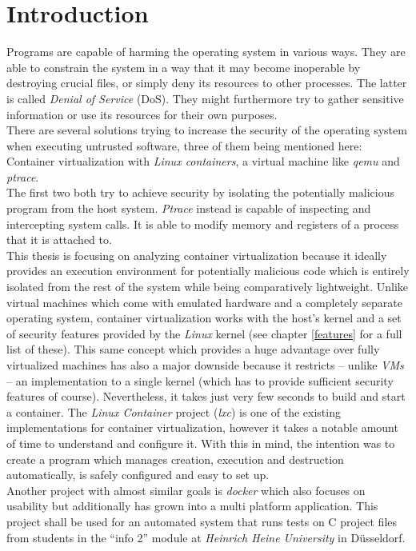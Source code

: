 \chapter{Introduction}

Programs are capable of harming the operating system in various ways. They are able to constrain the system in a way that
it may become inoperable by destroying crucial files, or simply deny its resources to other processes.
The latter is called \textit{Denial of Service} (DoS).
They might furthermore try to gather sensitive information or use its resources for their own purposes.\\
There are several solutions trying to increase the security of the operating system when executing untrusted software,
three of them being mentioned here:\\
Container virtualization with \textit{Linux containers}\cite{lxc}, a virtual machine like \textit{qemu}\cite{qemu} and \textit{ptrace}\cite{ptrace}.\\
The first two both try to achieve security by isolating the potentially malicious program from the host system.
\textit{Ptrace} instead is capable of inspecting and intercepting system calls. It is able to modify memory and registers of a process that it is attached to.\\
This thesis is focusing on analyzing container virtualization because it ideally provides an execution environment for
potentially malicious code which is entirely isolated from the rest of the system while being comparatively
lightweight. Unlike virtual machines which come with emulated hardware and a completely separate operating
system, container virtualization works with the host's kernel and a set of security features provided by the
\textit{Linux} kernel (see chapter \ref{features} for a full list of these).
This same concept which provides a huge advantage over fully virtualized machines has also a major downside
because it restricts -- unlike  \textit{VMs} -- an implementation to a single kernel (which has to provide sufficient
security features of course). Nevertheless, it takes just very few seconds to build and start a container.
The \textit{Linux Container} project (\textit{lxc}) is one of the existing implementations for container virtualization,
however it takes a notable amount of time to understand and configure it. With this in mind, the intention was to create a program
which manages creation, execution and destruction automatically, is safely configured and easy to set up.\\
Another project with almost similar goals is \textit{docker}\cite{docker} which also focuses on usability but
additionally has grown into a multi platform application.
This project shall be used for an automated system that runs tests on C project files from students in the ``info 2'' module
at \textit{Heinrich Heine University} in Düsseldorf.